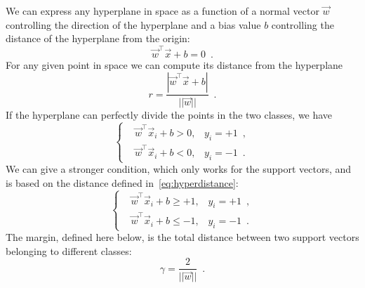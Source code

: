 \smallskip

We can express any hyperplane in space as a function of a normal vector $\vec{w}$ controlling the direction of the hyperplane and a bias value $b$ controlling the distance of the hyperplane from the origin:
\begin{equation}
	\label{eq:hyperplane}
	\vec{w}^\top\vec{x} + b = 0 \enspace.
\end{equation}
For any given point in space we can compute its distance from the hyperplane
\begin{equation}
	\label{eq:hyperdistance}
	r = \frac{|\vec{w}^\top\vec{x} + b|}{||\vec{w}||} \enspace.
\end{equation}
If the hyperplane can perfectly divide the points in the two classes, we have
\begin{equation}
	\label{eq:system}
	\begin{cases}
		 & \vec{w}^\top\vec{x}_i + b > 0, \hspace{10pt} y_i = +1 \enspace, \\
		 & \vec{w}^\top\vec{x}_i + b < 0, \hspace{10pt} y_i = -1 \enspace.
	\end{cases}
\end{equation}
We can give a stronger condition, which only works for the support vectors, and is based on the
distance defined in~\ref{eq:hyperdistance}:
\begin{equation}
	\label{eq:svm-system}
	\begin{cases}
		 & \vec{w}^\top\vec{x}_i + b \geq +1, \hspace{10pt} y_i = +1 \enspace, \\
		 & \vec{w}^\top\vec{x}_i + b \leq -1, \hspace{10pt} y_i = -1 \enspace.
	\end{cases}
\end{equation}
The margin, defined here below, is the total distance between two support vectors belonging to different classes:
\begin{equation}
	\label{eq:margin}
	\gamma = \frac{2}{||\vec{w}||} \enspace.
\end{equation}

